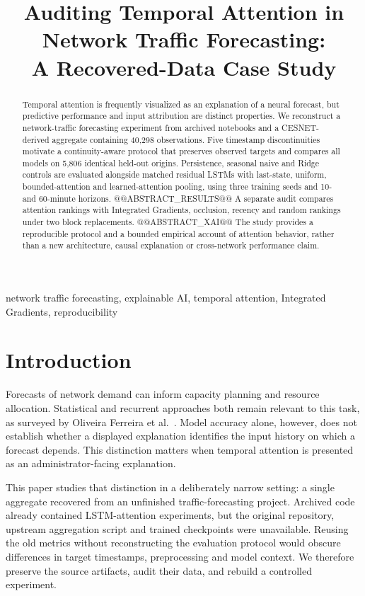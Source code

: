 \documentclass[conference]{IEEEtran}
\title{Auditing Temporal Attention in Network Traffic Forecasting:\\A Recovered-Data Case Study}
\author{\IEEEauthorblockN{Anonymous Research Draft}}
\begin{document}
\maketitle
\begin{abstract}
Temporal attention is frequently visualized as an explanation of a neural forecast, but predictive performance and input attribution are distinct properties. We reconstruct a network-traffic forecasting experiment from archived notebooks and a CESNET-derived aggregate containing 40,298 observations. Five timestamp discontinuities motivate a continuity-aware protocol that preserves observed targets and compares all models on 5,806 identical held-out origins. Persistence, seasonal naive and Ridge controls are evaluated alongside matched residual LSTMs with last-state, uniform, bounded-attention and learned-attention pooling, using three training seeds and 10- and 60-minute horizons. @@ABSTRACT_RESULTS@@ A separate audit compares attention rankings with Integrated Gradients, occlusion, recency and random rankings under two block replacements. @@ABSTRACT_XAI@@ The study provides a reproducible protocol and a bounded empirical account of attention behavior, rather than a new architecture, causal explanation or cross-network performance claim.
\end{abstract}
\begin{IEEEkeywords}
network traffic forecasting, explainable AI, temporal attention, Integrated Gradients, reproducibility
\end{IEEEkeywords}

\section{Introduction}
Forecasts of network demand can inform capacity planning and resource allocation. Statistical and recurrent approaches both remain relevant to this task, as surveyed by Oliveira Ferreira et al.~\cite{survey}. Model accuracy alone, however, does not establish whether a displayed explanation identifies the input history on which a forecast depends. This distinction matters when temporal attention is presented as an administrator-facing explanation.

This paper studies that distinction in a deliberately narrow setting: a single aggregate recovered from an unfinished traffic-forecasting project. Archived code already contained LSTM-attention experiments, but the original repository, upstream aggregation script and trained checkpoints were unavailable. Reusing the old metrics without reconstructing the evaluation protocol would obscure differences in target timestamps, preprocessing and model context. We therefore preserve the source artifacts, audit their data, and rebuild a controlled experiment.
\end{document}
